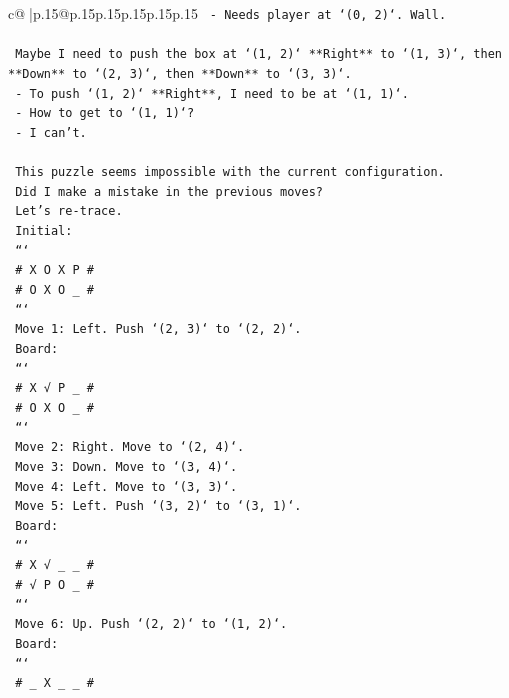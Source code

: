 \documentclass{article}
\begin{document}
{\begin{supertabular}{c@{$\;$}|p{.15\linewidth}@{}p{.15\linewidth}p{.15\linewidth}p{.15\linewidth}p{.15\linewidth}p{.15\linewidth}}
{{{\texttt{   {-} Needs player at `(0, 2)`. Wall.} \\
\\ 
\texttt{   Maybe I need to push the box at `(1, 2)` **Right** to `(1, 3)`, then **Down** to `(2, 3)`, then **Down** to `(3, 3)`.} \\
\texttt{   {-} To push `(1, 2)` **Right**, I need to be at `(1, 1)`.} \\
\texttt{   {-} How to get to `(1, 1)`?} \\
\texttt{     {-} I can't.} \\
\\ 
\texttt{   This puzzle seems impossible with the current configuration.} \\
\texttt{   Did I make a mistake in the previous moves?} \\
\texttt{   Let's re{-}trace.} \\
\texttt{   Initial:} \\
\texttt{   ```} \\
\texttt{   \# X O X P \#} \\
\texttt{   \# O X O \_ \#} \\
\texttt{   ```} \\
\texttt{   Move 1: Left. Push `(2, 3)` to `(2, 2)`.} \\
\texttt{   Board:} \\
\texttt{   ```} \\
\texttt{   \# X √ P \_ \#} \\
\texttt{   \# O X O \_ \#} \\
\texttt{   ```} \\
\texttt{   Move 2: Right. Move to `(2, 4)`.} \\
\texttt{   Move 3: Down. Move to `(3, 4)`.} \\
\texttt{   Move 4: Left. Move to `(3, 3)`.} \\
\texttt{   Move 5: Left. Push `(3, 2)` to `(3, 1)`.} \\
\texttt{   Board:} \\
\texttt{   ```} \\
\texttt{   \# X √ \_ \_ \#} \\
\texttt{   \# √ P O \_ \#} \\
\texttt{   ```} \\
\texttt{   Move 6: Up. Push `(2, 2)` to `(1, 2)`.} \\
\texttt{   Board:} \\
\texttt{   ```} \\
\texttt{   \# \_ X \_ \_ \#} \\
}}}
\end{supertabular}}
\end{document}
